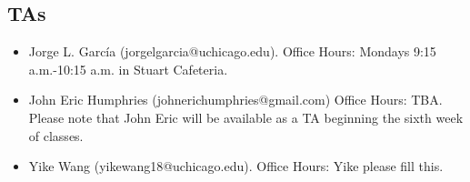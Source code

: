\documentclass[12pt]{article}
\begin{document}
\subsection{TAs}
\begin{itemize}
\item Jorge L. Garc\'{i}a (jorgelgarcia@uchicago.edu). Office Hours: Mondays 9:15 a.m.-10:15 a.m. in Stuart Cafeteria.  
\item John Eric Humphries (johnerichumphries@gmail.com) Office Hours: TBA. Please note that John Eric will be available as a TA beginning the sixth week of classes.
\item Yike Wang (yikewang18@uchicago.edu). Office Hours: Yike please fill this. 

\end{itemize}
\end{document}
